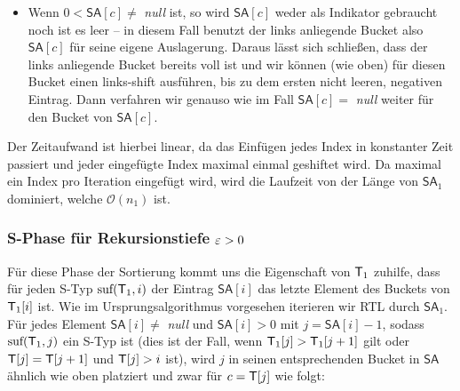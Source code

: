 \begin{itemize}
\item Wenn $ 0 < \mathsf{SA}[c] \neq$ \textit{null} ist, so wird $\mathsf{SA}[c]$ weder als Indikator gebraucht noch ist es leer -- in diesem Fall benutzt der links anliegende Bucket also $\mathsf{SA}[c]$ für seine eigene Auslagerung. Daraus lässt sich schließen, dass der links anliegende Bucket bereits voll ist und wir können (wie oben) für diesen Bucket einen links-shift ausführen, bis zu dem ersten nicht leeren, negativen Eintrag. Dann verfahren wir genauso wie im Fall $\mathsf{SA}[c] = $ \textit{null} weiter für den Bucket von $\mathsf{SA}[c]$.
\end{itemize}

Der Zeitaufwand ist hierbei linear, da das Einfügen jedes Index in konstanter Zeit passiert und jeder eingefügte Index maximal einmal geshiftet wird. Da maximal ein Index pro Iteration eingefügt wird, wird die Laufzeit von der Länge von $\mathsf{SA}_1$ dominiert, welche $\mathcal O(n_1)$ ist.

\subsubsection{ S-Phase für Rekursionstiefe $\varepsilon > 0$}

Für diese Phase der Sortierung kommt uns die Eigenschaft von $\inputtext_1$ zuhilfe, dass für jeden S-Typ $\suf(\inputtext_1, i)$ der Eintrag $\mathsf{SA}[i]$ das letzte Element des Buckets von $\inputtext_1[i]$ ist. Wie im Ursprungsalgorithmus vorgesehen iterieren wir RTL durch $\mathsf{SA}_1$. Für jedes Element $\mathsf{SA}[i] \neq $ \textit{null} und $\mathsf{SA}[i] > 0$ mit $j = \mathsf{SA}[i] -1$, sodass $\suf(\inputtext_1,j)$ ein S-Typ ist (dies ist der Fall, wenn $\inputtext_1[j] > \inputtext_1[j+1]$ gilt oder $\inputtext[j] = \inputtext[j+1]$ und $\inputtext[j] > i$ ist), wird $j$ in seinen entsprechenden Bucket in $\mathsf{SA}$ ähnlich wie oben platziert und zwar für $c = \inputtext[j]$ wie folgt:

